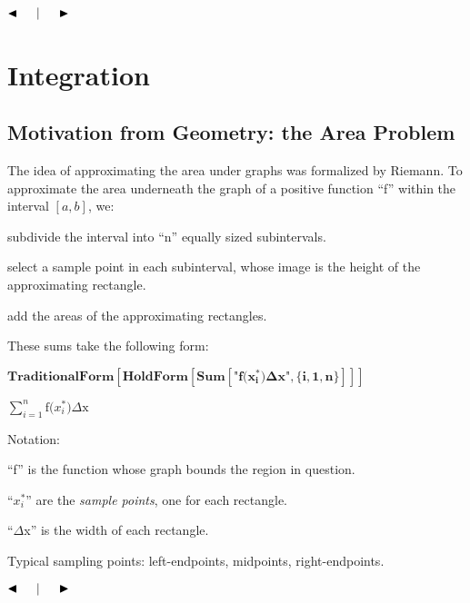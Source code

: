 \documentclass{article}
\begin{document}
$\blacktriangleleft \thickspace \thickspace \thickspace $$\thickspace \thickspace |\thickspace \thickspace $$\thickspace \thickspace \thickspace
\blacktriangleright $



\section*{Integration}

\subsection*{Motivation from Geometry: the Area Problem}

The idea of approximating the area under graphs was formalized by Riemann. To approximate the area underneath the graph of a positive function {``}f{''}
within the interval \([a,b]\), we: 

subdivide the interval into {``}n{''} equally sized subintervals. 

select a sample point in each subinterval, whose image is the height of the approximating rectangle.

add the areas of the approximating rectangles.

These sums take the following form:

\begin{doublespace}
\noindent\(\pmb{\text{TraditionalForm}\left[\text{HoldForm}\left[\text{Sum}\left[\text{$\texttt{"}$f(}x_i^*\text{)$\Delta $x$\texttt{"}$},\{i,1,n\}\right]\right]\right]}\)
\end{doublespace}

\begin{doublespace}
\noindent\(\sum _{i=1}^n \text{f(}x_i^*\text{)$\Delta $x}\)
\end{doublespace}

Notation:

{``}f{''} is the function whose graph bounds the region in question. 

{``}\(x_i^*\){''} are the \textit{ sample points}, one for each rectangle. 

{``}$\Delta $x{''} is the width of each rectangle.

Typical sampling points: left-endpoints, midpoints, right-endpoints.



$\blacktriangleleft \thickspace \thickspace \thickspace $$\thickspace \thickspace |\thickspace \thickspace $$\thickspace \thickspace \thickspace
\blacktriangleright $
\end{document}
